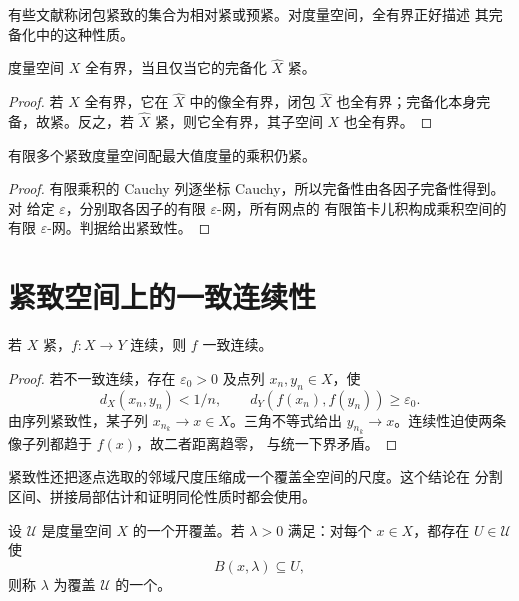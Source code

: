 有些文献称闭包紧致的集合为相对紧或预紧。对度量空间，全有界正好描述
其完备化中的这种性质。

\begin{corollary}[全有界空间的完备化]
\label{cor:completion-total-bounded-compact}
度量空间 \(X\) 全有界，当且仅当它的完备化 \(\widehat X\) 紧。
\end{corollary}

\begin{proof}
若 \(X\) 全有界，它在 \(\widehat X\) 中的像全有界，闭包
\(\widehat X\) 也全有界；完备化本身完备，故紧。反之，若
\(\widehat X\) 紧，则它全有界，其子空间 \(X\) 也全有界。
\end{proof}

\begin{corollary}[有限乘积]
有限多个紧致度量空间配最大值度量的乘积仍紧。
\end{corollary}

\begin{proof}
有限乘积的 Cauchy 列逐坐标 Cauchy，所以完备性由各因子完备性得到。对
给定 \(\varepsilon\)，分别取各因子的有限 \(\varepsilon\)-网，所有网点的
有限笛卡儿积构成乘积空间的有限 \(\varepsilon\)-网。判据给出紧致性。
\end{proof}

\section{紧致空间上的一致连续性}

\begin{theorem}
\label{thm:heine-cantor-metric}
若 \(X\) 紧，\(f:X\to Y\) 连续，则 \(f\) 一致连续。
\end{theorem}

\begin{proof}
若不一致连续，存在 \(\varepsilon_0>0\) 及点列 \(x_n,y_n\in X\)，使
\[
 d_X(x_n,y_n)<1/n,\qquad
 d_Y(f(x_n),f(y_n))\ge\varepsilon_0.
\]
由序列紧致性，某子列 \(x_{n_k}\to x\in X\)。三角不等式给出
\(y_{n_k}\to x\)。连续性迫使两条像子列都趋于 \(f(x)\)，故二者距离趋零，
与统一下界矛盾。
\end{proof}

紧致性还把逐点选取的邻域尺度压缩成一个覆盖全空间的尺度。这个结论在
分割区间、拼接局部估计和证明同伦性质时都会使用。

\begin{definition}[Lebesgue 数]
设 \(\mathcal U\) 是度量空间 \(X\) 的一个开覆盖。若 \(\lambda>0\)
满足：对每个 \(x\in X\)，都存在 \(U\in\mathcal U\) 使
\[
 B(x,\lambda)\subseteq U,
\]
则称 \(\lambda\) 为覆盖 \(\mathcal U\) 的一个。
\end{definition}

